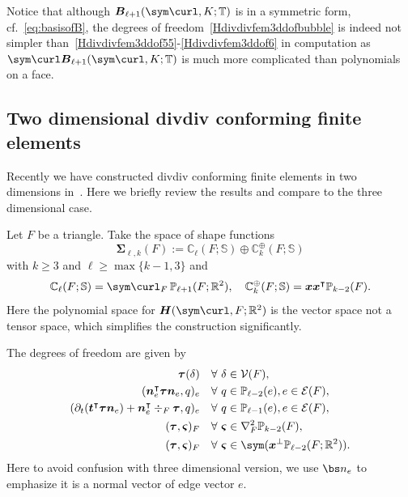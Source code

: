 Notice that although $\boldsymbol B_{\ell+1}(\sym\curl, K;\mathbb T)$ is in a symmetric form, cf.~\eqref{eq:basisofB}, the degrees of freedom~\eqref{Hdivdivfem3ddofbubble} is indeed not simpler than~\eqref{Hdivdivfem3ddof55}-\eqref{Hdivdivfem3ddof6} in computation as $\sym\curl\boldsymbol B_{\ell+1}(\sym\curl, K;\mathbb T)$ is much more complicated than polynomials on a face. 

\subsection{Two dimensional divdiv conforming finite elements}\label{sec:2D}
Recently we have constructed divdiv conforming finite elements in two dimensions in~\cite{ChenHuang2020}. Here we briefly review the results and compare to the three dimensional case. 

Let $F$ be a triangle. Take the space of shape functions
\begin{equation}\label{eq:2DSigma}
\boldsymbol \Sigma_{\ell,k}(F):= \mathbb C_{\ell}(F;\mathbb S)\oplus\mathbb C_k^{\oplus}(F;\mathbb S)
\end{equation}
with $k\geq 3$ and $\ell\geq \max\{k-1, 3\}$ and 
\[
\mathbb C_{\ell}(F; \mathbb S)=\sym \curl_F \, \mathbb  P_{\ell +1}(F; \mathbb R^2),\quad \mathbb C_k^{\oplus}(F; \mathbb S)=\boldsymbol  x\boldsymbol  x^{\intercal}\mathbb P_{k-2}(F).
\]
Here the polynomial space for $\boldsymbol H(\sym \curl, F; \mathbb R^2)$ is the vector space not a tensor space, which simplifies the construction significantly. 

The degrees of freedom are given by
\begin{align}
\boldsymbol \tau (\delta) & \quad\forall~\delta\in \mathcal V(F), \label{Hdivdivfemdof1}\\
(\boldsymbol  n_{e}^{\intercal}\boldsymbol \tau\boldsymbol  n_{e}, q)_e & \quad\forall~q\in\mathbb P_{\ell-2}(e),  e\in\mathcal E(F),\label{Hdivdivfemdof2}\\
(\partial_{t}(\boldsymbol  t^{\intercal}\boldsymbol \tau\boldsymbol  n_{e})+\boldsymbol  n_{e}^{\intercal}\div_F\boldsymbol \tau, q)_e & \quad\forall~q\in\mathbb P_{\ell-1}(e),  e\in\mathcal E(F),\label{Hdivdivfemdof3}\\
(\boldsymbol \tau, \boldsymbol \varsigma)_F & \quad\forall~\boldsymbol \varsigma\in\nabla_F^2\mathbb P_{k-2}(F), \label{Hdivdivfemdof4}\\
(\boldsymbol \tau, \boldsymbol \varsigma)_F & \quad\forall~\boldsymbol \varsigma\in \sym (\boldsymbol x^{\bot} \mathbb P_{\ell-2}(F;\mathbb R^2)). \label{Hdivdivfemdof5}
\end{align}
Here to avoid confusion with three dimensional version, we use $\bs n_e$ to emphasize it is a normal vector of edge vector $e$. 

